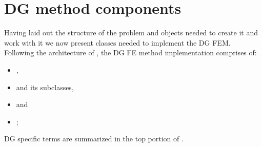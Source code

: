 \section{DG method components}
Having laid out the structure of the \sfepy{} problem and objects needed to create
it and work with it we now present classes needed to implement the DG FEM. Following the
architecture of \sfepy{}, the DG FE method implementation comprises of:
\begin{itemize}
    \item {},
    \item {} and its subclasses,
    \item {} and
    \item {};
\end{itemize}
DG specific terms are summarized in the top portion of .
